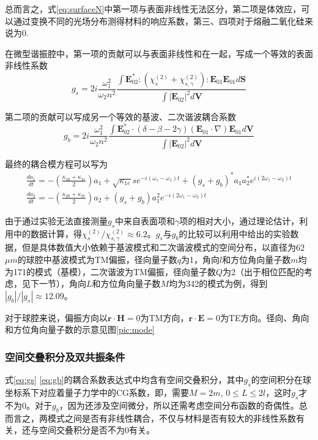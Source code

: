 \documentclass[UTF8,a4paper,cs4size,hyperref]{ctexart}
\begin{document}
总而言之，式\ref{eq:surfaceN}中第一项与表面非线性无法区分，第二项是体效应，可以通过变换不同的光场分布测得材料的响应系数，第三、四项对于熔融二氧化硅来说为0.

在微型谐振腔中，第一项的贡献可以与表面非线性和在一起，写成一个等效的表面非线性系数
\begin{equation}
g_s = 2i\frac{\omega_1^2}{\omega_2n^2}\frac{\int \mathbf{E}_{02}^*:(\chi^{(2)}_s+\chi^{(2)}_{s,\gamma}):\mathbf{E}_{01}\mathbf{E}_{01} d\mathbf{S}}{\int |\mathbf{E}_{02}|^2 d\mathbf{V}}
\label{eq:gs}
\end{equation}


第二项的贡献可以写成另一个等效的基波、二次谐波耦合系数
\begin{equation}
g_b =  2i\frac{\omega_1^2}{\omega_2n^2}\frac{\int \mathbf{E}_{02}^* \cdot (\delta-\beta-2\gamma)(\mathbf{E}_{01}\cdot\nabla)\mathbf{E}_{01} d\mathbf{V}}{\int |\mathbf{E}_{02}|^2 d\mathbf{V}}
\label{eq:gb}
\end{equation}

最终的耦合模方程可以写为
\begin{gather}
\label{eq:cpmode}
\frac{da_1}{dt} = -(\frac{\kappa_{10}+\kappa_{1e}}{2})a_1+\sqrt{\kappa_{1e}}se^{-i(\omega_s-\omega_1)t}+(g_s+g_b)^*a_1a_2^*e^{i(2\omega_1-\omega_2)t} \\
\frac{da_2}{dt} = -(\frac{\kappa_{20}+\kappa_{2e}}{2})a_2+(g_s+g_b)a_1^2e^{-i(2\omega_1-\omega_2)t}
\label{eq:cpmode2}
\end{gather}

由于通过实验无法直接测量$g_s$中来自表面项和$\gamma$项的相对大小，通过理论估计，利用\cite{terhune1987second}中的数据计算，得$\chi^{(2)}_s/\chi^{(2)}_{s,\gamma}\approx 6.2$。$g_s$与$g_b$的比较可以利用\cite{rodriguez2008calibration}中给出的实验数据，但是具体数值大小依赖于基波模式和二次谐波模式的空间分布，以直径为62$\mu m$的球腔中基波模式为TM偏振，径向量子数$q$为1，角向$l$和方位角向量子数$m$均为171的模式（基模），二次谐波为TM偏振，径向量子数$Q$为2（出于相位匹配的考虑，见下一节），角向$L$和方位角向量子数$M$均为342的模式为例，得到$|g_b|/|g_s|\approx12.09$。

对于球腔来说，偏振方向以$\mathbf{r}\cdot\mathbf{H} = 0$为TM方向，$\mathbf{r}\cdot\mathbf{E} = 0$为TE方向。径向、角向和方位角向量子数的示意见图\ref{pic:mode}


\subsubsection{空间交叠积分及双共振条件}
\label{sec:2Resonance}
式\ref{eq:gs} \ref{eq:gb}的耦合系数表达式中均含有空间交叠积分，其中$g_s$的空间积分在球坐标系下对应着量子力学中的CG系数，即，需要$M=2m$, $0\le L \le 2l$，这时$g_s$才不为0。对于$g_b$，因为还涉及空间微分，所以还需考虑空间分布函数的奇偶性。总而言之，两模式之间是否有非线性耦合，不仅与材料是否有较大的非线性系数有关，还与空间交叠积分是否不为0有关。
\end{document}

